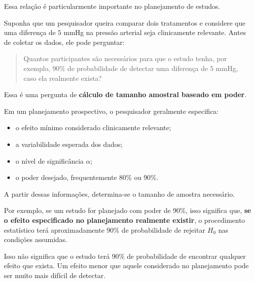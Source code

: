 Essa relação é particularmente importante no planejamento de estudos.

Suponha que um pesquisador queira comparar dois tratamentos e considere que
uma diferença de $5$ mmHg na pressão arterial seja clinicamente relevante.
Antes de coletar os dados, ele pode perguntar:

\begin{quote}
Quantos participantes são necessários para que o estudo tenha, por exemplo,
$90\%$ de probabilidade de detectar uma diferença de $5$ mmHg, caso ela
realmente exista?
\end{quote}

Essa é uma pergunta de \textbf{cálculo de tamanho amostral baseado em poder}.

Em um planejamento prospectivo, o pesquisador geralmente especifica:

\begin{itemize}
    \item o efeito mínimo considerado clinicamente relevante;
    \item a variabilidade esperada dos dados;
    \item o nível de significância $\alpha$;
    \item o poder desejado, frequentemente $80\%$ ou $90\%$.
\end{itemize}

A partir dessas informações, determina-se o tamanho de amostra necessário.

Por exemplo, se um estudo for planejado com poder de $90\%$, isso significa que,
\textbf{se o efeito especificado no planejamento realmente existir}, o
procedimento estatístico terá aproximadamente $90\%$ de probabilidade de
rejeitar $H_0$ nas condições assumidas.

Isso não significa que o estudo terá $90\%$ de probabilidade de encontrar
qualquer efeito que exista. Um efeito menor que aquele considerado no
planejamento pode ser muito mais difícil de detectar.

